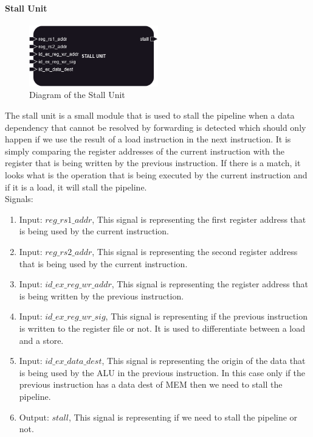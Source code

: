 \paragraph{Stall Unit}

\begin{figure}[H]
    \centering
    \includegraphics[width=0.5\textwidth]{design/pipelined/decode/images/stall_unit.png}
    \caption{Diagram of the Stall Unit}
    \label{fig:stall_unit}
\end{figure}

The stall unit is a small module that is used to stall the pipeline when a data dependency that cannot be resolved by forwarding is detected
which should only happen if we use the result of a load instruction in the next instruction. It is simply comparing the register addresses of the
current instruction with the register that is being written by the previous instruction. If there is a match, it looks what is the operation that is
being executed by the current instruction and if it is a load, it will stall the pipeline. \\

Signals:
\begin{enumerate}[label={\textbullet}]
    \item Input: $reg\_rs1\_addr$, This signal is representing the first register address that is being used by the current instruction.
    \item Input: $reg\_rs2\_addr$, This signal is representing the second register address that is being used by the current instruction.
    \item Input: $id\_ex\_reg\_wr\_addr$, This signal is representing the register address that is being written by the previous instruction.
    \item Input: $id\_ex\_reg\_wr\_sig$, This signal is representing if the previous instruction is written to the register file or not.
    It is used to differentiate between a load and a store.
    \item Input: $id\_ex\_data\_dest$, This signal is representing the origin of the data that is being used by the ALU in the previous instruction.
    In this case only if the previous instruction has a data dest of MEM then we need to stall the pipeline.
    \item Output: $stall$, This signal is representing if we need to stall the pipeline or not.
\end{enumerate}